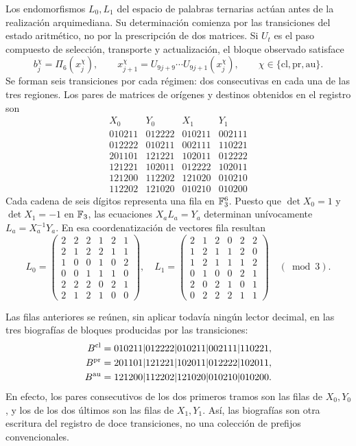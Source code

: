 Los endomorfismos \(L_0,L_1\) del espacio de palabras ternarias actúan antes de la realización arquimediana. Su determinación comienza por las transiciones del estado aritmético, no por la prescripción de dos matrices. Si \(U_t\) es el paso compuesto de selección, transporte y actualización, el bloque observado satisface
\[
 b_j^\chi=\Pi_6(x_j^\chi),\qquad
 x_{j+1}^\chi=U_{9j+9}\cdots U_{9j+1}(x_j^\chi),
 \qquad \chi\in\{\mathrm{cl},\mathrm{pr},\mathrm{au}\}.
\]
Se forman seis transiciones por cada régimen: dos consecutivas en cada una de las tres regiones. Los pares de matrices de orígenes y destinos obtenidos en el registro son
\[
\begin{array}{c|c|c|c}
X_0&Y_0&X_1&Y_1\\\hline
010211&012222&010211&002111\\
012222&010211&002111&110221\\
201101&121221&102011&012222\\
121221&102011&012222&102011\\
121200&112202&121020&010210\\
112202&121020&010210&010200
\end{array}
\]
Cada cadena de seis dígitos representa una fila en \(\mathbb F_3^6\). Puesto que \(\det X_0=1\) y \(\det X_1=-1\) en \(\mathbb F_3\), las ecuaciones \(X_aL_a=Y_a\) determinan unívocamente \(L_a=X_a^{-1}Y_a\). En esa coordenatización de vectores fila resultan
\[
 L_0=\begin{pmatrix}
 2&2&2&1&2&1\\2&1&2&2&1&1\\1&0&0&1&0&2\\
 0&0&1&1&1&0\\2&2&2&0&2&1\\2&1&2&1&0&0
 \end{pmatrix},\quad
 L_1=\begin{pmatrix}
 2&1&2&0&2&2\\1&2&1&1&2&0\\1&2&1&1&1&2\\
 0&1&0&0&2&1\\2&0&2&1&0&1\\0&2&2&2&1&1
 \end{pmatrix}\quad(\bmod3).
\]

Las filas anteriores se reúnen, sin aplicar todavía ningún lector decimal,
en las tres biografías de bloques producidas por las transiciones:
\begin{align}
 B^{\rm cl}
  &=010211|012222|010211|002111|110221,\notag\\
 B^{\rm pr}
  &=201101|121221|102011|012222|102011,
 \label{eq:biografias-tpk-tres-caracteres}\\
 B^{\rm au}
  &=121200|112202|121020|010210|010200.\notag
\end{align}
En efecto, los pares consecutivos de los dos primeros tramos son las filas
de \(X_0,Y_0\), y los de los dos últimos son las filas de \(X_1,Y_1\).
Así, las biografías son otra escritura del registro de doce transiciones, no
una colección de prefijos convencionales.

